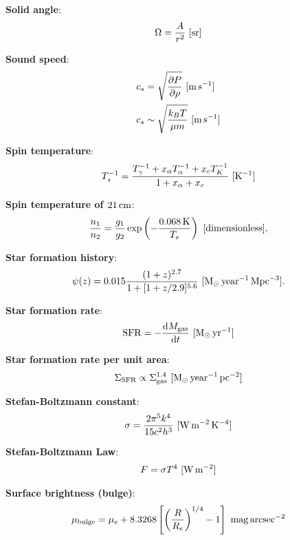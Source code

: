 \documentclass[a4paper,11pt]{article}
\begin{document}
{\noindent}\textbf{Solid angle}:
\begin{align*}
    \Omega = \frac{A}{r^2} ~ [{\rm sr}]
\end{align*}

{\noindent}\textbf{Sound speed}:
\begin{align*}
    c_s &= \sqrt{\frac{\partial P}{\partial\rho}} ~ [{\rm m\,s^{-1}}] \\
    c_s &\sim \sqrt{\frac{k_BT}{\mu m}} ~ [{\rm m\,s^{-1}}]
\end{align*}

{\noindent}\textbf{Spin temperature}:
\begin{align*}
    T_s^{-1} = \frac{T_\gamma^{-1} + x_\alpha T_\alpha^{-1} + x_cT_K^{-1}}{1+x_\alpha+x_c} ~ [{\rm K^{-1}}]
\end{align*}

{\noindent}\textbf{Spin temperature of $21\,{\rm cm}$}:
\begin{align*}
    \frac{n_1}{n_2} = \frac{g_1}{g_2}\exp\left(-\frac{0.068\,{\rm K}}{T_s}\right) ~ [{\rm dimensionless}],
\end{align*}

{\noindent}\textbf{Star formation history}:
\begin{align*}
    \psi(z) = 0.015\frac{(1+z)^{2.7}}{1+[1+z/2.9]^{5.6}} ~ [{\rm M_\odot\,year^{-1}\,Mpc^{-3}}].
\end{align*}

{\noindent}\textbf{Star formation rate}:
\begin{align*}
    \mathrm{SFR} = -\frac{\mathrm{d}M_\mathrm{gas}}{\mathrm{d}t} ~ [{\rm M_\odot\,yr^{-1}}]
\end{align*}

{\noindent}\textbf{Star formation rate per unit area}:
\begin{align*}
    \Sigma_\mathrm{SFR} \propto \Sigma_\mathrm{gas}^{1.4} ~ [{\rm M_\odot\,year^{-1}\,pc^{-2}}]
\end{align*}

{\noindent}\textbf{Stefan-Boltzmann constant}:
\begin{align*}
    \sigma = \frac{2\pi^5k^4}{15c^2h^3} ~ [{\rm W\,m^{-2}\,K^{-4}}]
\end{align*}

{\noindent}\textbf{Stefan-Boltzmann Law}:
\begin{align*}
    F = \sigma T^4 ~ [{\rm W\,m^{-2}}]
\end{align*}

{\noindent}\textbf{Surface brightness (bulge)}:
\begin{align*}
    \mu_\mathrm{bulge} = \mu_e + 8.3268\left[\left(\frac{R}{R_e}\right)^{1/4}-1\right] ~ {\rm mag\,arcsec^{-2}}
\end{align*}
\end{document}
